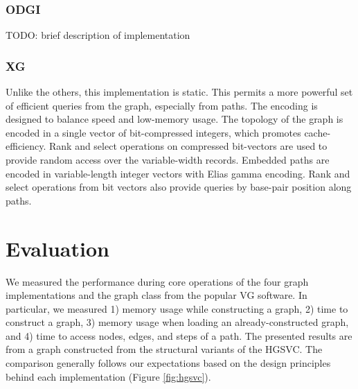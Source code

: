 \documentclass{article}
\begin{document}
\subsubsection{ODGI}

TODO: brief description of implementation

\subsubsection{XG}

Unlike the others, this implementation is static. This permits a more powerful set of efficient queries from the graph, especially from paths. The encoding is designed to balance speed and low-memory usage. The topology of the graph is encoded in a single vector of bit-compressed integers, which promotes cache-efficiency. Rank and select operations on compressed bit-vectors are used to provide random access over the variable-width records. Embedded paths are encoded in variable-length integer vectors with Elias gamma encoding. Rank and select operations from bit vectors also provide queries by base-pair position along paths.

\section{Evaluation}

We measured the performance during core operations of the four graph implementations and the graph class from the popular VG software. In particular, we measured 1) memory usage while constructing a graph, 2) time to construct a graph, 3) memory usage when loading an already-constructed graph, and 4) time to access nodes, edges, and steps of a path. The presented results are from a graph constructed from the structural variants of the HGSVC. The comparison generally follows our expectations based on the design principles behind each implementation (Figure \ref{fig:hgsvc}).
\end{document}
